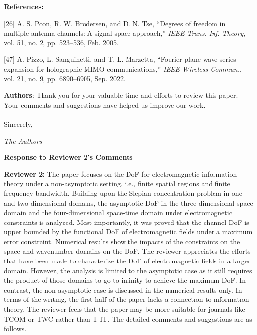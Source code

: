 \documentclass[a4paper,12pt]{article}
\begin{document}
{\color{blue}
	{\bf References:}
	
	[26] A. S. Poon, R. W. Brodersen, and D. N. Tse, “Degrees of freedom in multiple-antenna channels: A signal space approach,” {\it IEEE Trans. Inf. Theory}, vol. 51, no. 2, pp. 523–536, Feb. 2005.

[47] A. Pizzo, L. Sanguinetti, and T. L. Marzetta, “Fourier plane-wave series expansion for holographic MIMO communications,” {\it IEEE Wireless Commun.}, vol. 21, no. 9, pp. 6890–6905, Sep. 2022.
}

{\color{blue} \textbf{Authors}: Thank you for your valuable time and efforts to review this paper. Your comments and suggestions have helped us improve our work.
	\\
	\\
	Sincerely,
	
	{\it The Authors}
}


\clearpage


\begin{center}
    {\Large\bf Response to Reviewer 2's Comments}
\end{center}

\textbf{Reviewer 2:}
The paper focuses on the DoF for electromagnetic information theory under a non-asymptotic setting, i.e., finite spatial regions and finite frequency bandwidth. Building upon the Slepian concentration problem in one and two-dimensional domains, the asymptotic DoF in the three-dimensional space domain and the four-dimensional space-time domain under electromagnetic constraints is analyzed. Most importantly, it was proved that the channel DoF is upper bounded by the functional DoF of electromagnetic fields under a maximum error constraint. Numerical results show the impacts of the constraints on the space and wavenumber domains on the DoF. The reviewer appreciates the efforts that have been made to characterize the DoF of electromagnetic fields in a larger domain. However, the analysis is limited to the asymptotic case as it still requires the product of those domains to go to infinity to achieve the maximum DoF. In contrast, the non-asymptotic case is discussed in the numerical results only. In terms of the writing, the first half of the paper lacks a connection to information theory. The reviewer feels that the paper may be more suitable for journals like TCOM or TWC rather than T-IT. The detailed comments and suggestions are as follows.
\end{document}
